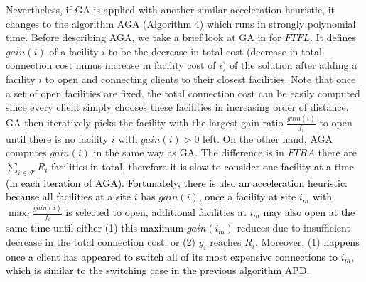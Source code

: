 \documentclass[10pt]{llncs}
\begin{document}
Nevertheless, if GA is applied with another similar acceleration heuristic,
it changes to the algorithm AGA\textit{ }(Algorithm 4) which runs
in strongly polynomial time. Before describing AGA, we take a brief
look at GA in \cite{Guha03FTFL2.41} for $FTFL$. It defines $ $$gain\left(i\right)$
of a facility $i$ to be the decrease in total cost (decrease in total
connection cost minus increase in facility cost of $i$) of the solution
after adding a facility $i$ to open and connecting clients to their
closest facilities. Note that once a set of open facilities are fi{}xed,
the total connection cost can be easily computed since every client
simply chooses these facilities in increasing order of distance. GA
then iteratively picks the facility with the largest gain ratio $\frac{gain\left(i\right)}{f_{i}}$
to open until there is no facility $i$ with $gain\left(i\right)>0$
left. On the other hand, AGA computes $gain\left(i\right)$ in the
same way as GA. The difference is in $FTRA$ there are \textcolor{black}{$\sum_{i\in\mathcal{F}}R_{i}$
facilities in total, therefore it is slow to consider one facility
at a time (in each iteration of AGA). Fortunately, there is also an
acceleration heuristic: because all facilities at a site $i$ has
$gain\left(i\right)$, once a facility at site $i_{m}$ with} $\max_{i}\frac{gain\left(i\right)}{f_{i}}$\textcolor{black}{{}
is selected to open, additional facilities at $i_{m}$ may also open
at the same time until either (1) this maximum} \textcolor{black}{$gain\left(i_{m}\right)$}
reduces due to insufficient decrease in the total connection cost;
or (2) $y_{i}$ reaches $R_{i}$. Moreover, (1) \textcolor{black}{happens
once a client has appeared to switch all of its most expensive connections
to $i_{m}$, which is similar to the switching case in the previous
algorithm APD.}
\end{document}
